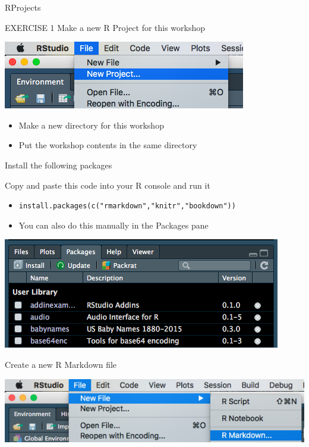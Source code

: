 \documentclass[
  ignorenonframetext,
]{beamer}
\providecommand{\tightlist}{%
  \setlength{\itemsep}{0pt}\setlength{\parskip}{0pt}}
\begin{document}
\begin{frame}[fragile]{RProjects}
\protect\hypertarget{rprojects}{}

\begin{block}{EXERCISE 1 \textbar{} Make a new R Project for this
workshop}

\includegraphics{images/new_project.png}

\begin{itemize}
\tightlist
\item
  Make a new directory for this workshop
\item
  Put the workshop contents in the same directory
\end{itemize}

\end{block}

\begin{block}{Install the following packages}

Copy and paste this code into your R console and run it

\begin{itemize}
\tightlist
\item
  \texttt{install.packages(c("rmarkdown","knitr","bookdown"))}
\item
  You can also do this manually in the Packages pane
\end{itemize}

\includegraphics{images/packages_pane.png}

\end{block}

\begin{block}{Create a new R Markdown file}

\includegraphics{images/new_rmarkdown1.png}


\end{block}
\end{frame}
\end{document}
